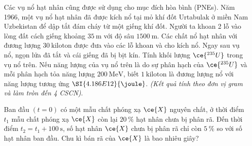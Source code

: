 \begin{ex}
	Các vụ nổ hạt nhân cũng được sử dụng cho mục đích hòa bình (PNEs). Năm 1966, một vụ nổ hạt nhân đã được kích nổ tại mỏ khí đốt Urtabulak ở miền Nam Uzbekistan để dập tắt đám cháy từ một giếng khí đốt. Người ta khoan 2 lỗ vào lòng đất cách giếng khoảng $\SI{35}{\meter}$ với độ sâu $\SI{1500}{\meter}$. Các chất nổ hạt nhân với đương lượng $\SI{30}{\text{kiloton}}$ được đưa vào các lỗ khoan và cho kích nổ. Ngay sau vụ nổ, ngọn lửa đã tắt và cái giếng đã bị bịt kín. Tính khối lượng $\ce{^{235}U}$ trong vụ nổ trên. Nếu năng lượng của vụ nổ trên là do sự phân hạch của $\ce{^{235}U}$ và mỗi phân hạch tỏa năng lượng $\SI{200}{\mega\electronvolt}$, biết $\SI{1}{\text{kiloton}}$ là đương lượng nổ với năng lượng tương ứng $\SI{4.186E12}{\joule}$. \textit{(Kết quả tính theo đơn vị gram và làm tròn đến 4 CSCN)}.
\end{ex}
\begin{ex}
	Ban đầu $\left(t=0\right)$ có một mẫu chất phóng xạ $\ce{X}$ nguyên chất, ở thời điểm $t_1$ mẫu chất phóng xạ $\ce{X}$ còn lại $\SI{20}{\percent}$ hạt nhân chưa bị phân rã. Đến thời điểm $t_2=t_1+\SI{100}{\second}$, số hạt nhân $\ce{X}$ chưa bị phân rã chỉ còn $\SI{5}{\percent}$ so với số hạt nhân ban đầu. Chu kì bán rã của $\ce{X}$ là bao nhiêu giây?	
\end{ex}
